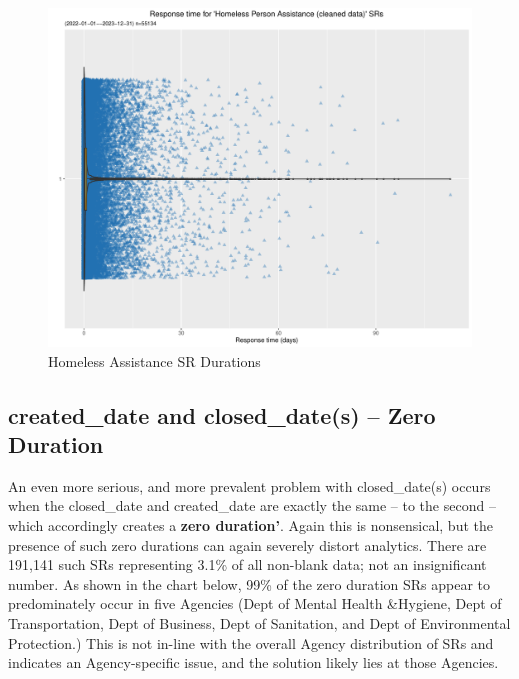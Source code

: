 \documentclass[12pt, titlepage]{article}
\begin{document}
	\begin{figure}[tbp]
	 	 \centering
	 	 \includegraphics[width = \textwidth]{homeless_response_time_clean.pdf}
		 \caption{Homeless Assistance SR Durations}
		 \label{fig:homeless}
	\end{figure}
		
\subsection{created\_date and closed\_date(s) --  Zero Duration}
\label{sec: zeroduration}		
	An even more serious, and more prevalent problem with closed\_date(s) 
	occurs when the closed\_date and created\_date are exactly the same -- to 
	the second -- which accordingly creates a \textbf{zero duration'}. Again 
	this is nonsensical, but the presence of such zero durations can again 
	severely distort analytics. There are 191,141 such SRs representing 3.1\% of 
	all non-blank data; not an insignificant number. As shown in the chart 
	below, 99\% of the zero duration SRs appear to predominately occur in five 
	Agencies (Dept of Mental Health \&Hygiene, Dept of Transportation, 
	Dept of Business, Dept of Sanitation, and Dept of Environmental Protection.) 
	This is not in-line with the overall Agency distribution of SRs and indicates an 
	Agency-specific issue, and the solution likely lies at those Agencies.
	
\end{document}
